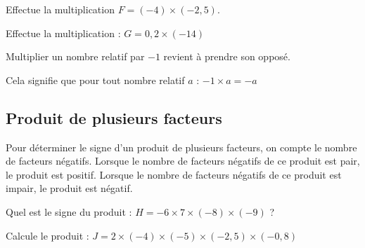 \documentclass[a4paper,10pt]{report}
\begin{document}
\begin{ex}
Effectue la multiplication $F=(-4)\times  (-2,5)$.

\noindent\grandscarreaux{\linewidth}{2.2cm}
\end{ex}

\begin{ex}
Effectue la multiplication : $G=0,2 \times (-14)$

\noindent\grandscarreaux{\linewidth}{2.2cm}
\end{ex}

\begin{prop}
Multiplier un nombre relatif par $-1$ revient à prendre son opposé.
\end{prop}

\begin{rem}
Cela signifie que pour tout nombre relatif $a$ : $-1 \times a=-a$
\end{rem}

\vspace{-2mm}
\subsection{Produit de plusieurs facteurs}

\begin{meth}
Pour déterminer le signe d'un produit de plusieurs facteurs, on compte le nombre de facteurs négatifs.
Lorsque le nombre de facteurs négatifs de ce produit est pair, le produit est positif.
Lorsque le nombre de facteurs négatifs de ce produit est impair, le produit est négatif.
\end{meth}

\begin{ex}
Quel est le signe du produit : $H=-6 \times 7 \times (-8) \times (-9)$ ?

\noindent\grandscarreaux{\linewidth}{1.6cm}
\end{ex}

\begin{ex}
Calcule le produit : $J=2 \times (-4) \times (-5) \times (-2,5) \times (-0,8)$

\noindent\grandscarreaux{\linewidth}{2.2cm}
\end{ex}
\end{document}
